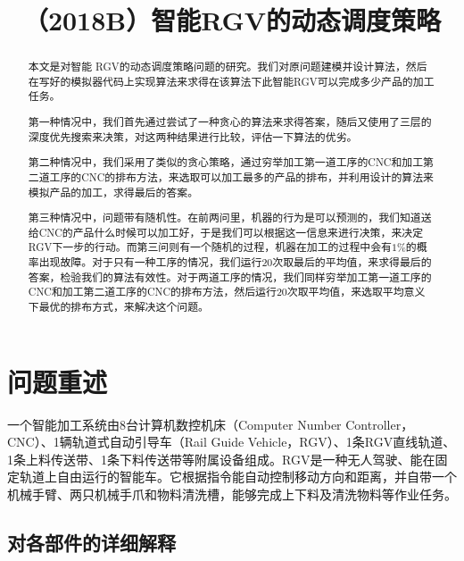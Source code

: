 \documentclass{cumcmthesis}
\title{（2018B）智能RGV的动态调度策略}
\begin{document}
\maketitle
\begin{abstract}

本文是对智能 RGV的动态调度策略问题的研究。我们对原问题建模并设计算法，然后在写好的模拟器代码上实现算法来求得在该算法下此智能RGV可以完成多少产品的加工任务。

第一种情况中，我们首先通过尝试了一种贪心的算法来求得答案，随后又使用了三层的深度优先搜索来决策，对这两种结果进行比较，评估一下算法的优劣。

第二种情况中，我们采用了类似的贪心策略，通过穷举加工第一道工序的CNC和加工第二道工序的CNC的排布方法，来选取可以加工最多的产品的排布，并利用设计的算法来模拟产品的加工，求得最后的答案。

第三种情况中，问题带有随机性。在前两问里，机器的行为是可以预测的，我们知道送给CNC的产品什么时候可以加工好，于是我们可以根据这一信息来进行决策，来决定RGV下一步的行动。而第三问则有一个随机的过程，机器在加工的过程中会有$1\%$的概率出现故障。对于只有一种工序的情况，我们运行20次取最后的平均值，来求得最后的答案，检验我们的算法有效性。对于两道工序的情况，我们同样穷举加工第一道工序的CNC和加工第二道工序的CNC的排布方法，然后运行20次取平均值，来选取平均意义下最优的排布方式，来解决这个问题。

\end{abstract}


\section{问题重述}

一个智能加工系统由8台计算机数控机床（Computer Number Controller，CNC）、1辆轨道式自动引导车（Rail Guide Vehicle，RGV）、1条RGV直线轨道、1条上料传送带、1条下料传送带等附属设备组成。RGV是一种无人驾驶、能在固定轨道上自由运行的智能车。它根据指令能自动控制移动方向和距离，并自带一个机械手臂、两只机械手爪和物料清洗槽，能够完成上下料及清洗物料等作业任务。

\subsection{对各部件的详细解释}
\end{document}
